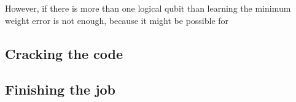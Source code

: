 \documentclass[twocolumn,showpacs,preprintnumbers,amsmath,amssymb,nofootinbib,pra,floatfix]{revtex4}
\begin{document}
However, if there is more than one logical qubit than learning the minimum weight error is not enough, because it might be possible for 
\subsection{Cracking the code}

\label{cracking-the-code}
\subsection{Finishing the job}
\label{finishing-the-job}
\end{document}
